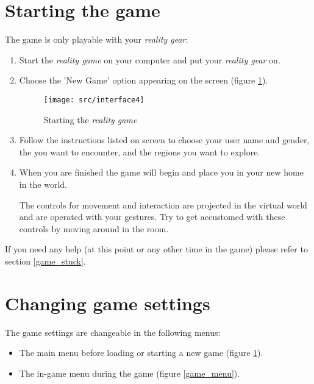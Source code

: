 
\section{Starting the game}
\label{gameStart}

The game is only playable with your \emph{\poke{} reality gear}:
\begin{enumerate}
\item Start the \emph{\poke{} reality game} on your computer and put your \emph{\poke{} reality gear} on.
\item Choose the 'New Game' option appearing on the screen (figure \ref{game_start}).
\begin{figure}[!ht]
\begin{center}
\texttt{[image: src/interface4]}
\end{center}
\caption[Starting the \emph{\pokeT{} reality game}]{Starting the \emph{\poke{} reality game}}
\label{game_start}
\end{figure}
\item Follow the instructions listed on screen to choose your user name and gender, the \poke{} you want to encounter, and the regions you want to explore.
\item When you are finished the game will begin and place you in your new home in the \poke{} world. 

The controls for movement and interaction are projected in the virtual world and are operated with your gestures. Try to get accustomed with these controls by moving around in the room. 
\end{enumerate}
If you need any help (at this point or any other time in the game) please refer to section \ref{game_stuck}.

\section{Changing game settings}
\label{gameSettings}
The game settings are changeable in the following menus:
\begin{itemize}
\item The main menu before loading or starting a new game (figure \ref{game_start}).
\item The in-game menu during the game (figure \ref{game_menu}).
\end{itemize}

